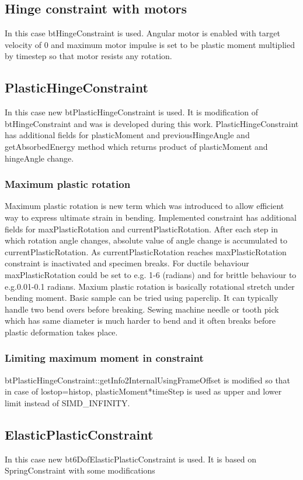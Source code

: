 \subsection{Hinge constraint with motors}
In this case btHingeConstraint is used.
Angular motor is enabled with target velocity of 0 and maximum motor impulse is set to
be plastic moment multiplied by timestep so that motor resists any rotation.

\subsection{PlasticHingeConstraint}
In this case new btPlasticHingeConstraint is used.
It is modification of btHingeConstraint and was is developed during this work.
PlasticHingeConstraint has additional fields for plasticMoment and previousHingeAngle and 
getAbsorbedEnergy method which returns product of plasticMoment and hingeAngle change.

\subsubsection{Maximum plastic rotation}
Maximum plastic rotation is new term which was introduced to allow efficient way to express ultimate strain in bending.
Implemented constraint has additional fields for maxPlasticRotation and currentPlasticRotation. 
After each step in which rotation angle changes, absolute value of 
angle change is accumulated to currentPlasticRotation. As currentPlasticRotation 
reaches maxPlasticRotation constraint is inactivated and specimen breaks. 
For ductile behaviour maxPlasticRotation could be set to e.g. 1-6 (radians) and for brittle
 behaviour to e.g.0.01-0.1 radians. Maxium plastic rotation is basically rotational stretch under bending moment.
 Basic sample can be tried using paperclip. It can typically handle two bend overs before breaking. 
Sewing machine needle or tooth pick which has same diameter is much harder to bend and it 
often breaks before plastic deformation takes place. 

\subsubsection{Limiting maximum moment in constraint}
btPlasticHingeConstraint::getInfo2InternalUsingFrameOffset is modified so that in case of lostop=histop, 
plasticMoment*timeStep is used as upper and lower limit instead of SIMD\_INFINITY. 

\subsection{ElasticPlasticConstraint}
In this case new bt6DofElasticPlasticConstraint is used.
It is based on SpringConstraint with some modifications

